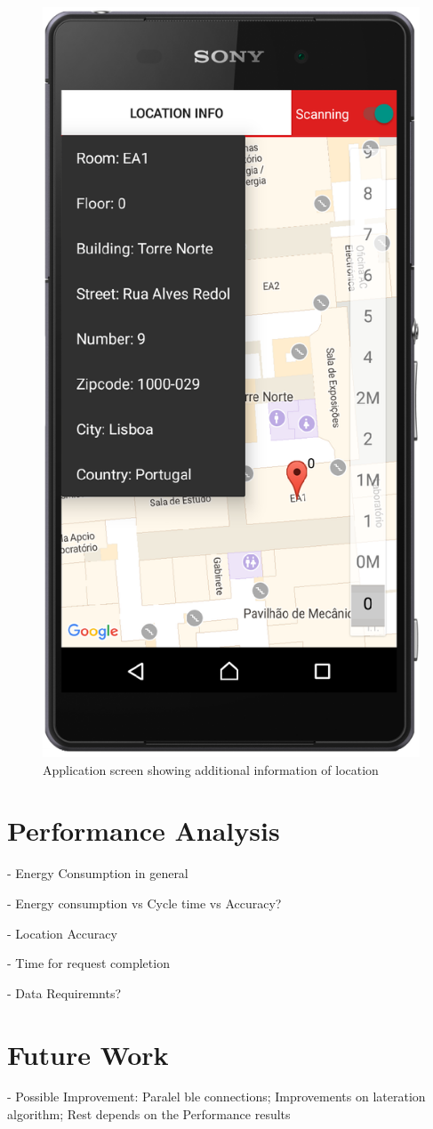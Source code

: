 \documentclass[a4paper]{IEEEtran}
\begin{document}
\begin{figure}
	\centering
		\includegraphics[width=0.5\linewidth]{figures/app_focused_menu.png}
	\caption[Application screen showing additional information of location]{Application screen showing additional information of location}
	\label{fig:AppMenu}
\end{figure}






\section{Performance Analysis}
\label{sec:performance}

- Energy Consumption in general

- Energy consumption vs Cycle time vs Accuracy?

- Location Accuracy

- Time for request completion

- Data Requiremnts?
 



\section{Future Work}
\label{sec:future}

- Possible Improvement: Paralel ble connections; Improvements on lateration algorithm;  Rest depends on the Performance results
\end{document}

